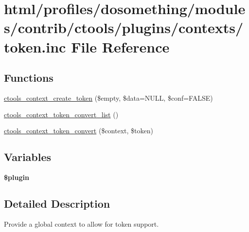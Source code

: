\hypertarget{profiles_2dosomething_2modules_2contrib_2ctools_2plugins_2contexts_2token_8inc}{
\section{html/profiles/dosomething/modules/contrib/ctools/plugins/contexts/token.inc File Reference}
\label{profiles_2dosomething_2modules_2contrib_2ctools_2plugins_2contexts_2token_8inc}
}
\subsection*{Functions}
\begin{DoxyCompactItemize}
\item 
\hyperlink{profiles_2dosomething_2modules_2contrib_2ctools_2plugins_2contexts_2token_8inc_ab8eb1d3d654f1fde3224dc0d963d381c}{ctools\_\-context\_\-create\_\-token} (\$empty, \$data=NULL, \$conf=FALSE)
\item 
\hyperlink{profiles_2dosomething_2modules_2contrib_2ctools_2plugins_2contexts_2token_8inc_a7a253406a63a33265393b3468539a6f7}{ctools\_\-context\_\-token\_\-convert\_\-list} ()
\item 
\hyperlink{profiles_2dosomething_2modules_2contrib_2ctools_2plugins_2contexts_2token_8inc_ab50aa70da250bffd56e1948218a6b3c8}{ctools\_\-context\_\-token\_\-convert} (\$context, \$token)
\end{DoxyCompactItemize}
\subsection*{Variables}
\begin{DoxyCompactItemize}
\item 
{\bfseries \$plugin}
\end{DoxyCompactItemize}


\subsection{Detailed Description}
Provide a global context to allow for token support. 

